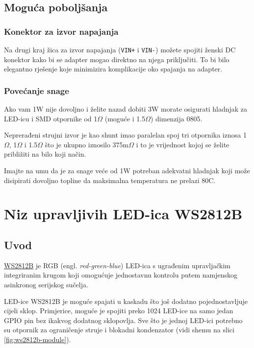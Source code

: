 \documentclass[times, utf8, zavrsni, numeric, sort]{fer}
\begin{document}
\section{Moguća poboljšanja}

\subsection{Konektor za izvor napajanja}
Na drugi kraj žica za izvor napajanja (\texttt{VIN+} i \texttt{VIN-}) možete spojiti ženski DC konektor kako bi se adapter mogao direktno na njega priključiti. To bi bilo elegantno rješenje koje minimizira komplikacije oko spajanja na adapter.

\subsection{Povećanje snage}
\label{sec:powerinc}
Ako vam 1W nije dovoljno i želite nazad dobiti 3W morate osigurati hladnjak za LED-icu i SMD otpornike od 1$\Omega$ (moguće i 1.5$\Omega$) dimenzija 0805.

Neprerađeni strujni izvor je kao shunt imao paralelan spoj tri otpornika iznosa 1$\Omega$, 1$\Omega$ i 1.5$\Omega$ što je ukupno iznosilo 375m$\Omega$ i to je vrijednost kojoj se želite približiti na bilo koji način.

Imajte na umu da je za snage veće od 1W potreban adekvatni hladnjak koji može disipirati dovoljno topline da maksimalna temperatura ne prelazi 80{\textdegree}C.


\chapter{Niz upravljivih LED-ica WS2812B}
\section{Uvod}

\href{https://cdn-shop.adafruit.com/datasheets/WS2812B.pdf}{WS2812B} je RGB (engl. \textit{red-green-blue}) LED-ica s ugrađenim upravljačkim integriranim krugom koji omogućuje jednostavnu kontrolu putem namjenskog asinkronog serijskog sučelja.

LED-ice WS2812B je moguće spajati u kaskadu što još dodatno pojednostavljuje cijeli sklop. Primjerice, moguće je spojiti preko 1024 LED-ice na samo jedan GPIO pin bez ikakvog dodatnog sklopovlja. Sve što je jednoj LED-ici potrebno su otpornik za ograničenje struje i blokadni kondenzator (vidi shemu na slici \ref{fig:ws2812b-module}).
\end{document}
